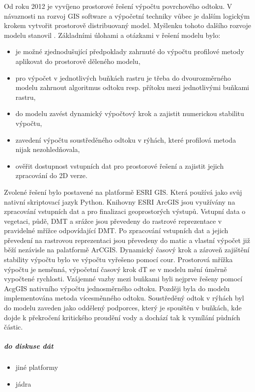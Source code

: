 Od roku 2012 je vyvíjeno prostorové řešení výpočtu povrchového odtoku. V návaznosti na rozvoj \acs{GIS} software a výpočetní techniky vůbec je  dalším logickým krokem vytvořit prostorově distribuovaný model. Myšlenku tohoto dalšího rozvoje modelu stanovil \cite {KavkaDisertace}. Základními úlohami a otázkami v řešení modelu bylo:
\begin{itemize}
\item je možné zjednodušující předpoklady zahrnuté do výpočtu profilové metody aplikovat do prostorově děleného modelu,
\item pro výpočet v jednotlivých buňkách rastru je třeba do dvourozměrného modelu zahrnout algoritmus odtoku resp. přítoku mezi jednotlivými buňkami rastru, 
\item do modelu zavést dynamický výpočtový krok a zajistit numerickou stabilitu výpočtu, 
\item zavedení výpočtu soustředěného odtoku v rýhách, které profilová metoda nijak nezohledňovala,
\item ověřit dostupnost vstupních dat pro prostorové řešení a zajistit jejich zpracování do 2D verze.
\end{itemize}

Zvolené řešení bylo postavené na platformě ESRI GIS. Která používá jako svůj nativní skriptovací jazyk Python. Knihovny ESRI ArcGIS jsou využívány na zpracování vstupních dat a pro finalizaci geoprostorých výstupů. Vstupní data o vegetaci, půdě, DMT a srážce jsou převedeny do rastrové reprezentace v pravidelné mřížce odpovídající DMT. Po zpracování vstupních dat a jejich převedení na rastrovou reprezentaci jsou převedeny do matic a vlastní výpočet již běží nezávisle na palatformě ArCGIS.
Dynamický časový krok a zároveň zajištění stability výpočtu bylo ve výpočtu vyřešeno pomocí \ac{cour}. Prostorová mřížka výpočtu je neměnná, výpočetní časový krok \acs{dT} se v modelu mění úměrně vypočtené rychlosti.
Vzájemné vazby mezi buňkami byli nejprve řešeny pomocí AcgGIS nativního výpočtu jednosměrného odtoku. Později byla do modelu implementována metoda vícesměnného odtoku. Soustředěný odtok v rýhách byl do modelu zaveden jako oddělený podporces, který je spouštěn v buňkách, kde dojde k překročení kritického proudění vody a dochází tak k vymílání půdních částic.  

\subparagraph{do diskuse dát}
\begin{itemize}
\item jiné platformy
\item jádra
\end{itemize}